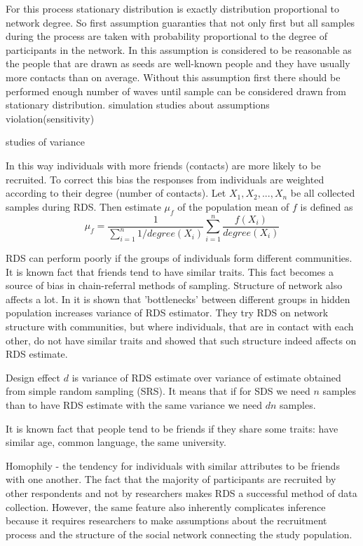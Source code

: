 \documentclass[12pt]{report}
\begin{document}
For this process stationary distribution is exactly distribution proportional to network degree. So first assumption guaranties that not only first but all samples during the process are taken with probability proportional to the degree of participants in the network. In \cite{salganik2004sampling} this assumption is considered to be reasonable as the people that are drawn as seeds are well-known people and they have usually more contacts than on average. Without this assumption first there should be performed enough number of waves until sample can be considered drawn from stationary distribution.
 simulation studies about assumptions violation(sensitivity) \cite{gile2010respondent}

studies of variance

In this way individuals with more friends (contacts) are more likely to be recruited. To correct this bias the responses from individuals are weighted according to their degree (number of contacts).
Let $X_1, X_2, ..., X_n$ be all collected samples during RDS.
Then estimate $\mu_f$ of the population mean of $f$ is defined \cite{goel2010assessing} as
$$\mu_f = \frac{1}{\sum\limits_{i=1}^n 1/degree(X_i)} \sum\limits_{i=1}^n \frac{f(X_i)}{degree(X_i)}$$

RDS can perform poorly if the groups of individuals form different communities. It is known fact that friends tend to have similar traits. This fact becomes a source of bias in chain-referral methods of sampling. Structure of network also affects a lot. In \cite{goel2009respondent} it is shown that 'bottlenecks' between different groups in hidden population increases variance of RDS estimator. They try RDS on network structure with communities, but where individuals, that are in contact with each other, do not have similar traits and showed that such structure indeed affects on RDS estimate. 

Design effect $d$ is variance of RDS estimate over variance of estimate obtained from simple random sampling (SRS). It means that if for SDS we need $n$ samples than to have RDS estimate with the same variance we need $dn$ samples. 

It is known fact that people tend to be friends if they share some traits: have similar age, common language, the same university.

Homophily - the tendency for individuals with similar attributes to be friends with one another.
The fact that the majority of participants are recruited by other respondents and not by researchers makes RDS a successful method of data collection. However, the same feature also inherently complicates inference because it requires researchers to make assumptions about the recruitment
process and the structure of the social network connecting the study population.



\end{document}
